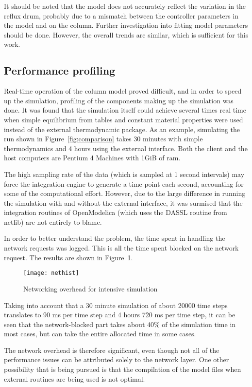 It should be noted that the model does not accurately reflect the variation in the reflux drum, probably due to a mismatch between the controller parameters in the model and on the column.  
Further investigation into fitting model parameters should be done.  
However, the overall trends are similar, which is sufficient for this work.

\subsection{Performance profiling}
Real-time operation of the column model proved difficult, and in order to speed up the simulation, profiling of the components making up the simulation was done.  
It was found that the simulation itself could achieve several times real time when simple equilibrium from tables and constant material properties were used instead of the external thermodynamic package.  
As an example, simulating the run shown in Figure~\ref{fig:comparison} takes 30 minutes with simple thermodynamics and 4 hours using the external interface.  
Both the client and the host computers are Pentium 4 Machines with 1GiB of ram.

The high sampling rate of the data (which is sampled at 1 second intervals) may force the integration engine to generate a time point each second, accounting for some of the computational effort. 
However, due to the large difference in running the simulation with and without the external interface, it was surmised that the integration routines of OpenModelica (which uses the DASSL routine from netlib) are not entirely to blame.

In order to better understand the problem, the time spent in handling the network requests was logged.  
This is all the time spent blocked on the network request.  
The results are shown in Figure~\ref{fig:overhead}.
\begin{figure}[htbp]
  \centering
  \texttt{[image: nethist]}
  \caption{Networking overhead for intensive simulation}
  \label{fig:overhead}
\end{figure}
Taking into account that a 30 minute simulation of about 20000 time steps translates to 90 ms per time step and 4 hours 720 ms per time step, it can be seen that the network-blocked part takes about 40\% of the simulation time in most cases, but can take the entire allocated time in some cases.  

The network overhead is therefore significant, even though not all of the performance issues can be attributed solely to the network layer. 
One other possibility that is being pursued is that the compilation of the model files when external routines are being used is not optimal.

